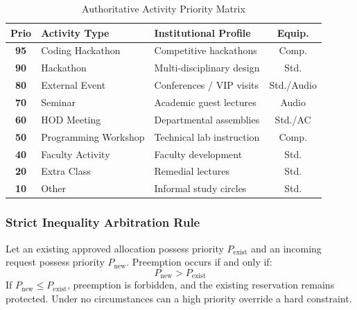 \documentclass[conference]{IEEEtran}
\begin{document}
\begin{table}[t]
\caption{Authoritative Activity Priority Matrix}
\label{tab:priorities}
\centering
\small
\begin{tabular}{cp{3.0cm}p{2.6cm}c}
\toprule
\textbf{Prio} & \textbf{Activity Type} & \textbf{Institutional Profile} & \textbf{Equip.} \\
\midrule
\textbf{95} & Coding Hackathon & Competitive hackathons & Comp. \\
\textbf{90} & Hackathon & Multi-disciplinary design & Std. \\
\textbf{80} & External Event & Conferences / VIP visits & Std./Audio \\
\textbf{70} & Seminar & Academic guest lectures & Audio \\
\textbf{60} & HOD Meeting & Departmental assemblies & Std./AC \\
\textbf{50} & Programming Workshop & Technical lab instruction & Comp. \\
\textbf{40} & Faculty Activity & Faculty development & Std. \\
\textbf{20} & Extra Class & Remedial lectures & Std. \\
\textbf{10} & Other & Informal study circles & Std. \\
\bottomrule
\end{tabular}
\end{table}

\subsubsection{Strict Inequality Arbitration Rule}
Let an existing approved allocation possess priority $P_{\text{exist}}$ and an incoming request possess priority $P_{\text{new}}$. Preemption occurs if and only if:
\begin{equation}
P_{\text{new}} > P_{\text{exist}}
\end{equation}
If $P_{\text{new}} \le P_{\text{exist}}$, preemption is forbidden, and the existing reservation remains protected. Under no circumstances can a high priority override a hard constraint.
\end{document}
